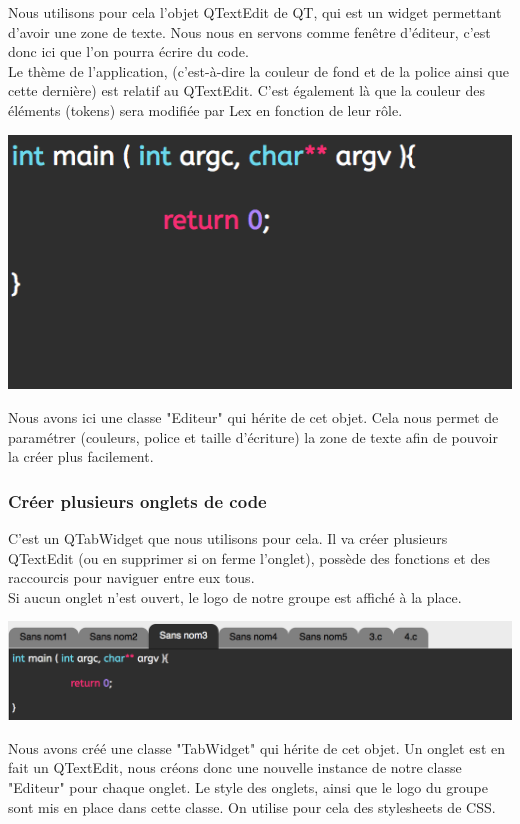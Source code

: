 \documentclass[a4paper,12pt]{article}
\begin{document}
			 	Nous utilisons pour cela l'objet QTextEdit de QT, qui est un widget permettant d'avoir une zone de texte. Nous nous en servons comme fenêtre d'éditeur, c'est donc ici que l'on pourra écrire du code.\\
			Le thème de l'application, (c'est-à-dire la couleur de fond et de la police ainsi que cette dernière) est relatif au QTextEdit. C'est également là que la couleur des éléments (tokens) sera modifiée par Lex en fonction de leur rôle.\\
			\begin{center}
				\includegraphics[scale=0.8]{images/QTextEdit}
				\vspace{0.5cm}
			\end{center}
			Nous avons ici une classe "Editeur" qui hérite de cet objet. Cela nous permet de paramétrer (couleurs, police et taille d'écriture) la zone de texte afin de pouvoir la créer plus facilement.\\
			
			\subsubsection*{Créer plusieurs onglets de code}
			
			 	C'est un QTabWidget que nous utilisons pour cela. Il va créer plusieurs QTextEdit (ou en supprimer si on ferme l'onglet), possède des fonctions et des raccourcis pour naviguer entre eux tous. \\
			Si aucun onglet n'est ouvert, le logo de notre groupe est affiché à la place.\\
			\begin{center}
				\includegraphics[scale=0.6]{images/QTabWidget}
				\vspace{0.5cm}
			\end{center}
			Nous avons créé une classe "TabWidget" qui hérite de cet objet. Un onglet est en fait un QTextEdit, nous créons donc une nouvelle instance de notre classe "Editeur" pour chaque onglet. Le style des onglets, ainsi que le logo du groupe sont mis en place dans cette classe. On utilise pour cela des stylesheets de CSS.\\
			
\end{document}
